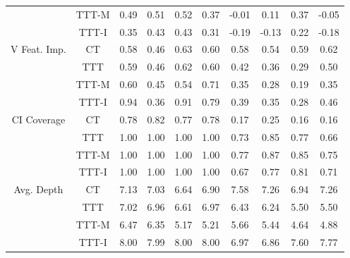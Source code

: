\documentclass[a4paper,12pt]{article}
\theoremstyle{proposition}
\begin{document}
\begin{appendices}
\begin{table}
\begin{center}
\begin{tabular}{|c|c||c|c|c|c||c|c|c|c|}
     & TTT-M &   0.49 &    0.51 &      0.52 &       0.37 &  -0.01 &    0.11 &      0.37 &      -0.05  \\
     & TTT-I &   0.35 &    0.43 &      0.43 &       0.31 &  -0.19 &   -0.13 &      0.22 &      -0.18  \\
\hline
\hline
\multirow{4}{6em}{V Feat. Imp.}  &    CT &   0.58 &    0.46 &      0.63 &       0.60 &   0.58 &    0.54 &      0.59 &       0.62  \\
 &   TTT &   0.59 &    0.46 &      0.62 &       0.60 &   0.42 &    0.36 &      0.29 &       0.50  \\
 & TTT-M &   0.60 &    0.45 &      0.54 &       0.71 &   0.35 &    0.28 &      0.19 &       0.35  \\
 & TTT-I &   0.94 &    0.36 &      0.91 &       0.79 &   0.39 &    0.35 &      0.28 &       0.46  \\
\hline
\hline
\multirow{4}{6em}{CI Coverage}   &    CT &   0.78 &    0.82 &      0.77 &       0.78 &   0.17 &    0.25 &      0.16 &       0.16  \\
  &   TTT &   1.00 &    1.00 &      1.00 &       1.00 &   0.73 &    0.85 &      0.77 &       0.66  \\
  & TTT-M &   1.00 &    1.00 &      1.00 &       1.00 &   0.77 &    0.87 &      0.85 &       0.75  \\
  & TTT-I &   1.00 &    1.00 &      1.00 &       1.00 &   0.67 &    0.77 &      0.81 &       0.71  \\
\hline
\hline
\multirow{4}{6em}{Avg. Depth}     &    CT &   7.13 &    7.03 &      6.64 &       6.90 &   7.58 &    7.26 &      6.94 &       7.26  \\
    &   TTT &   7.02 &    6.96 &      6.61 &       6.97 &   6.43 &    6.24 &      5.50 &       5.50  \\
    & TTT-M &   6.47 &    6.35 &      5.17 &       5.21 &   5.66 &    5.44 &      4.64 &       4.88  \\
    & TTT-I &   8.00 &    7.99 &      8.00 &       8.00 &   6.97 &    6.86 &      7.60 &       7.77  \\
\hline
\end{tabular}
\end{center}
\end{table}


\end{appendices}
\end{document}
